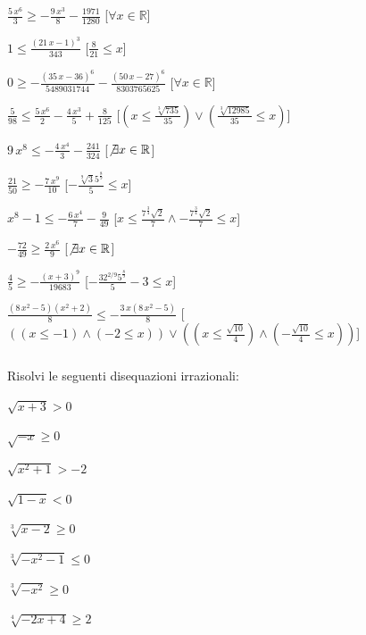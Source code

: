 \begin{esercizio}
\begin{enumeratea}
\item ${\frac {5\,{x}^{6}}{3}}\geq -{\frac {9\,{x}^{3}}{8}}-{\frac 
{1971}{1280}}$ 
\hfill [$\forall x \in \mathbb{R}$]
\item $1\leq {\frac { \left( 21\,x-1 \right) ^{3}}{343}}$ 
\hfill [${\frac {8}{21}}\leq x$]
\item $0\geq -{\frac { \left( 35\,x-36 \right) ^{6}}{5489031744}}-{\frac { 
\left( 50\,x-27 \right) ^{6}}{8303765625}}$ 
\hfill [$\forall x \in \mathbb{R}$]
\item ${\frac {5}{98}}\leq {\frac {5\,{x}^{6}}{2}}-{\frac 
{4\,{x}^{3}}{5}}+{\frac {8}{125}}$ 
\hfill [$(x\leq {\frac {\sqrt [3]{735}}{35}})\vee ({\frac {\sqrt 
[3]{12985}}{35}}\leq x)$]
\item $9\,{x}^{8}\leq -{\frac {4\,{x}^{4}}{3}}-{\frac {241}{324}}$ 
\hfill [$\not\exists x \in \mathbb{R}$]
\item ${\frac {21}{50}}\geq -{\frac {7\,{x}^{9}}{10}}$ 
\hfill [$-{\frac {\sqrt [9]{3}{5}^{{\frac {8}{9}}}}{5}}\leq x$]
\item ${x}^{8}-1\leq -{\frac {6\,{x}^{4}}{7}}-{\frac {9}{49}}$ 
\hfill [$x\leq {\frac {{7}^{{\frac {3}{4}}}\sqrt {2}}{7}} \wedge -{\frac 
{{7}^{{\frac {3}{4}}}\sqrt {2}}{7}}\leq x$]
\item $-{\frac {72}{49}}\geq {\frac {2\,{x}^{6}}{9}}$ 
\hfill [$\not\exists x \in \mathbb{R}$]
\item ${\frac {4}{5}}\geq -{\frac { \left( x+3 \right) ^{9}}{19683}}$ 
\hfill [$-{\frac {3 {2}^{2/9}{5}^{{\frac {8}{9}}}}{5}}-3\leq x$]
\item ${\frac { \left( 8\,{x}^{2}-5 \right)  \left( {x}^{2}+2 \right) }{8}}\leq 
-{\frac {3\,x \left( 8\,{x}^{2}-5 \right) }{8}}$ 
\hfill [$((x\leq -1) \wedge (-2\leq x))\vee ((x\leq {\frac {\sqrt {10}}{4}}) 
\wedge (-{\frac {\sqrt {10}}{4}}\leq x))$]
\end{enumeratea}
\end{esercizio}


\subsubsection*{}


\begin{esercizio}\label{ese:03.1}
Risolvi le seguenti disequazioni irrazionali:
\begin{multicols}{4}
\begin{enumeratea}
\item \(\sqrt{x+3} > 0\)
\item \(\sqrt{-x} \geq 0 \)
\item \(\sqrt{x^2 +1} > -2 \)
\item \(\sqrt{1 -x} < 0\)
\item \(\sqrt[3]{x-2} \geq 0\)
\item \(\sqrt[3]{-x^2-1} \leq 0\)
\item \(\sqrt[3]{-x^2} \geq 0\)
\item \(\sqrt[4]{-2x +4} \geq 2\)
\end{enumeratea}
\end{multicols}
\end{esercizio}

